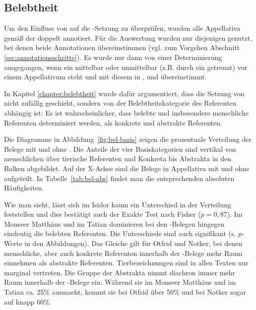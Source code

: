 \subsection{Belebtheit}\label{sec:ergeb-belebtheit}

Um den Einfluss von  auf die -Setzung zu überprüfen, wurden alle Appellativa  gemäß der  doppelt  annotiert. Für die Auswertung wurden nur diejenigen  genutzt, bei denen beide  Annotationen übereinstimmen (vgl. zum Vorgehen Abschnitt \ref{sec:annotationsschritte}). Es wurde nur dann von einer Determinierung ausgegangen, wenn ein  mittelbar oder unmittelbar (z.B. durch ein  getrennt) vor einem Appellativum  steht und mit diesem in ,  und   übereinstimmt.    


In Kapitel \ref{chapter:belebtheit} wurde dafür argumentiert, dass die Setzung von  nicht zufällig geschieht, sondern von der Belebtheitskategorie  des Referenten abhängig ist: Es ist wahrscheinlicher, dass belebte und insbesondere menschliche Referenten determiniert werden, als konkrete und abstrakte Referenten.\largerpage

Die Diagramme in Abbildung~\ref{fig:bel-basis} zeigen die prozentuale Verteilung der Belege mit und ohne  . Die Anteile der vier Basiskategorien sind vertikal von menschlichen über tierische Referenten und Konkreta  bis Abstrakta  in den Balken abgebildet. Auf der X-Achse sind die Belege in Appellativa  mit   und ohne   aufgeteilt.  In Tabelle~\ref{tab:bel-abs} findet man die entsprechenden absoluten Häufigkeiten.

Wie man sieht, lässt sich im Isidor kaum ein Unterschied in der Verteilung feststellen und dies bestätigt auch der Exakte Test nach Fisher ($p = 0{,}87$). Im Monseer Matthäus und im Tatian dominieren bei den -Belegen hingegen eindeutig die belebten Referenten. Die Unterschiede sind auch signifikant (s. $p$-Werte in den Abbildungen). Das Gleiche gilt für Otfrid und Notker, bei denen menschliche, aber auch konkrete Referenten innerhalb der -Belege mehr Raum einnehmen als abstrakte Referenten. Tierbezeichnungen sind in allen Texten nur marginal vertreten. Die Gruppe der Abstrakta  nimmt diachron immer mehr Raum innerhalb der -Belege ein: Während sie im Monseer Matthäus und im Tatian ca. 25\% ausmacht, kommt sie bei Otfrid über 50\% und bei Notker sogar auf knapp 60\%. 

